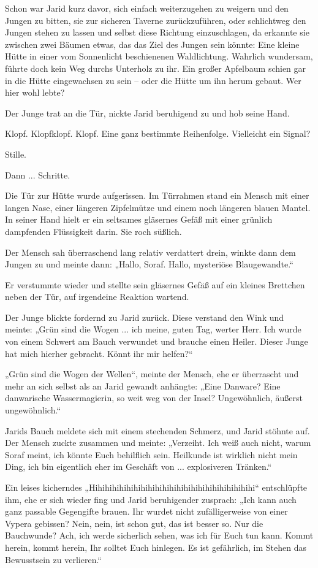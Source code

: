 Schon war Jarid kurz davor, sich einfach weiterzugehen zu weigern und den Jungen zu bitten, sie zur sicheren Taverne zurückzuführen, oder schlichtweg den Jungen stehen zu lassen und selbst diese Richtung einzuschlagen, da erkannte sie zwischen zwei Bäumen etwas, das das Ziel des Jungen sein könnte: Eine kleine Hütte in einer vom Sonnenlicht beschienenen Waldlichtung. Wahrlich wundersam, führte doch kein Weg durchs Unterholz zu ihr. Ein großer Apfelbaum schien gar in die Hütte eingewachsen zu sein – oder die Hütte um ihn herum gebaut. Wer hier wohl lebte?

Der Junge trat an die Tür, nickte Jarid beruhigend zu und hob seine Hand.

Klopf. Klopfklopf. Klopf. Eine ganz bestimmte Reihenfolge. Vielleicht ein Signal?

Stille.

Dann ... Schritte.

Die Tür zur Hütte wurde aufgerissen. Im Türrahmen stand ein Mensch mit einer langen Nase, einer längeren Zipfelmütze und einem noch längeren blauen Mantel. In seiner Hand hielt er ein seltsames gläsernes Gefäß mit einer grünlich dampfenden Flüssigkeit darin. Sie roch süßlich.

Der Mensch sah überraschend lang relativ verdattert drein, winkte dann dem Jungen zu und meinte dann: „Hallo, Soraf. Hallo, mysteriöse Blaugewandte.“

Er verstummte wieder und stellte sein gläsernes Gefäß auf ein kleines Brettchen neben der Tür, auf irgendeine Reaktion wartend.

Der Junge blickte fordernd zu Jarid zurück. Diese verstand den Wink und meinte: „Grün sind die Wogen ... ich meine, guten Tag, werter Herr. Ich wurde von einem Schwert am Bauch verwundet und brauche einen Heiler. Dieser Junge hat mich hierher gebracht. Könnt ihr mir helfen?“

„Grün sind die Wogen der Wellen“, meinte der Mensch, ehe er überrascht und mehr an sich selbst als an Jarid gewandt anhängte: „Eine Danware? Eine danwarische Wassermagierin, so weit weg von der Insel? Ungewöhnlich, äußerst ungewöhnlich.“

Jarids Bauch meldete sich mit einem stechenden Schmerz, und Jarid stöhnte auf. Der Mensch zuckte zusammen und meinte: „Verzeiht. Ich weiß auch nicht, warum Soraf meint, ich könnte Euch behilflich sein. Heilkunde ist wirklich nicht mein Ding, ich bin eigentlich eher im Geschäft von ... explosiveren Tränken.“

Ein leises kicherndes „Hihihihihihihihihihihihihihihihihihihihihihihi“ entschlüpfte ihm, ehe er sich wieder fing und Jarid beruhigender zusprach: „Ich kann auch ganz passable Gegengifte brauen. Ihr wurdet nicht zufälligerweise von einer Vypera gebissen? Nein, nein, ist schon gut, das ist besser so. Nur die Bauchwunde? Ach, ich werde sicherlich sehen, was ich für Euch tun kann. Kommt herein, kommt herein, Ihr solltet Euch hinlegen. Es ist gefährlich, im Stehen das Bewusstsein zu verlieren.“

